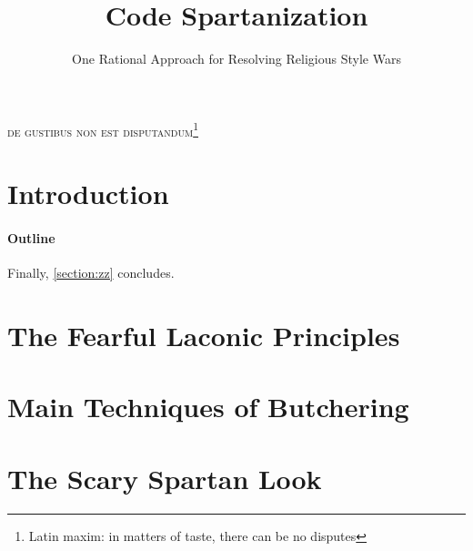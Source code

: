 \documentclass[preprint,10pt,nonatbib]{sigplanconf}
\title{Code Spartanization}
\subtitle{One Rational Approach for Resolving Religious Style Wars}
\begin{document}
\textsc{de gustibus non est disputandum\footnote{%
    Latin maxim: in matters of taste, there can be no disputes
}}
{\let\newpage\relax\maketitle}
\begin{flushright}
  \begin{minipage}{2.5in}
    \normalsize \rmfamily\scshape
    \color{red}{%
      suum cuique \newline
      Tu mortale, essere avvertiti. \newline
      Tu non Shallt Rimuovere \newline
      Questo comandamento \newline
      Mentre ci sono segni di Haste \newline
      in questo documento !!!! \newline
    }
  \end{minipage}
\end{flushright}

\begin{abstract}
  
\end{abstract}
\section{Introduction}


\paragraph{Outline}
\label{section:principia}
\label{section:techniques}
\label{section:look}
\label{section:jack}
\label{section:look}
\label{section:initial}
\label{section:zz}
Finally, \cref{section:zz} concludes.

\section{The Fearful Laconic Principles}
\label{section:principia}


\section{Main Techniques of Butchering}
\label{section:techniques}


\section{The Scary Spartan Look}
\label{section:look}

\end{document}
